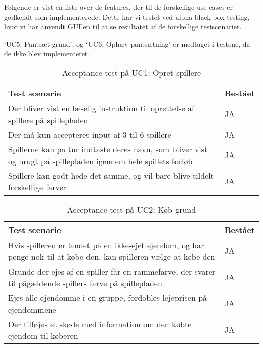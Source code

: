 \documentclass[class=article, crop=false]{standalone}
\begin{document}
    Følgende er vist en liste over de features, der til de forskellige use cases er godkendt som implementerede. Dette har vi testet ved alpha black box testing, hvor vi har anvendt GUI’en til at se resultatet af de forskellige testscenarier. \par
    ‘UC5: Pantsæt grund’, og ‘UC6: Ophæv pantsætning’ er medtaget i testene, da de ikke blev implementeret.

    \begin{table}[H]
        \caption{Acceptance test på UC1: Opret spillere }
        \begin{tabularx}{\textwidth}{|X|l|}
            \hline
            \textbf{Test scenarie}       & \textbf{Bestået}   \\ \hline
            Der bliver vist en læselig instruktion til oprettelse af spillere på spillepladen     & JA \\ \hline
            Der må kun accepteres input af 3 til 6 spillere    & JA \\ \hline
            Spillerne kan på tur indtaste deres navn, som bliver vist og brugt på spillepladen igennem hele spillets forløb     & JA  \\ \hline
            Spillere kan godt hede det samme, og vil bare blive tildelt forskellige farver     & JA \\ \hline
        \end{tabularx}
    \end{table}


    \begin{table}[H]
        \caption{Acceptance test på UC2: Køb grund}
        \begin{tabularx}{\textwidth}{|X|l|}
            \hline
            \textbf{Test scenarie}       & \textbf{Bestået}   \\ \hline
            Hvis spilleren er landet på en ikke-ejet ejendom, og har penge nok til at købe den, kan spilleren vælge at købe den    & JA \\ \hline
            Grunde der ejes af en spiller får en rammefarve, der svarer til pågældende spillers farve på spillepladen    & JA \\ \hline
            Ejes alle ejendomme i en gruppe, fordobles lejeprisen på ejendommene     & JA  \\ \hline
            Der tilføjes et skøde med information om den købte ejendom til køberen     & JA \\ \hline
        \end{tabularx}
    \end{table}
\end{document}

